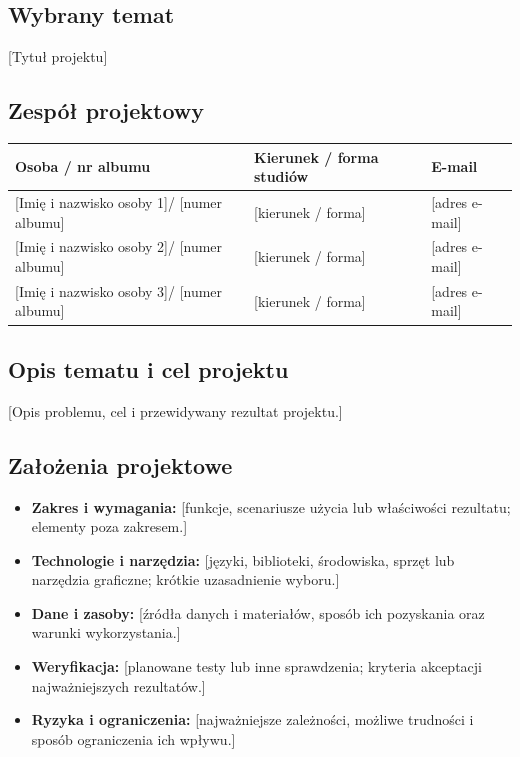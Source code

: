 \documentclass[11pt,a4paper,oneside]{article}
\newif\ifpodpowiedzi
\newcommand{\podpowiedz}[1]{\ifpodpowiedzi\par\begingroup\small\color{hintcolor}\textit{Wskazówka: #1}\par\endgroup\fi}
\newcommand{\pole}[1]{\textnormal{[#1]}}
\newcommand{\tytulprojektu}{\pole{Tytuł projektu}}
\newcommand{\studentA}{\pole{Imię i nazwisko osoby 1}}
\newcommand{\studentB}{\pole{Imię i nazwisko osoby 2}}
\newcommand{\studentC}{\pole{Imię i nazwisko osoby 3}}
\newcommand{\albumA}{\pole{numer albumu}}
\newcommand{\albumB}{\pole{numer albumu}}
\newcommand{\albumC}{\pole{numer albumu}}
\begin{document}
\subsection{Wybrany temat}
\podpowiedz{Podaj uzgodniony tytuł projektu, zgodny ze stroną tytułową. Powinien wskazywać przedmiot i cel pracy.}
\tytulprojektu

\subsection{Zespół projektowy}
\podpowiedz{Podaj dane wszystkich członków zespołu. Zespół jest co do zasady trzyosobowy; w wyjątkowych, uzasadnionych przypadkach, za zgodą dyrekcji instytutu, może być dwuosobowy. W takim przypadku usuń dane trzeciej osoby ze strony tytułowej i tabeli.}
\begin{tabularx}{\textwidth}{@{}Y Y Y@{}}
\toprule
Osoba / nr albumu & Kierunek / forma studiów & E-mail\\
\midrule
\studentA / \albumA & \pole{kierunek / forma} & \pole{adres e-mail}\\
\studentB / \albumB & \pole{kierunek / forma} & \pole{adres e-mail}\\
\studentC / \albumC & \pole{kierunek / forma} & \pole{adres e-mail}\\
\bottomrule
\end{tabularx}
\newpage
\subsection{Opis tematu i cel projektu}
\podpowiedz{Opisz problem, odbiorców i zamierzony rezultat. Jeśli korzystasz z opisu prowadzących, dostosuj go do uzgodnionego zakresu. Wyjaśnij, na czym polega praktyczny i inżynierski charakter pracy oraz po czym będzie można poznać, że cel został osiągnięty.}
\pole{Opis problemu, cel i przewidywany rezultat projektu.}


\subsection{Założenia projektowe}
\podpowiedz{Określ zakres możliwy do wykonania przez zespół w jednym semestrze, z uwzględnieniem jego liczebności. Oddziel wymagania podstawowe od rozszerzeń, które zostaną wykonane, jeśli pozwoli na to czas. Poniższe punkty dostosuj do charakteru projektu.}
\begin{itemize}
\item \textbf{Zakres i wymagania:} \pole{funkcje, scenariusze użycia lub właściwości rezultatu; elementy poza zakresem.}
\item \textbf{Technologie i narzędzia:} \pole{języki, biblioteki, środowiska, sprzęt lub narzędzia graficzne; krótkie uzasadnienie wyboru.}
\item \textbf{Dane i zasoby:} \pole{źródła danych i materiałów, sposób ich pozyskania oraz warunki wykorzystania.}
\item \textbf{Weryfikacja:} \pole{planowane testy lub inne sprawdzenia; kryteria akceptacji najważniejszych rezultatów.}
\item \textbf{Ryzyka i ograniczenia:} \pole{najważniejsze zależności, możliwe trudności i sposób ograniczenia ich wpływu.}
\end{itemize}
\end{document}
